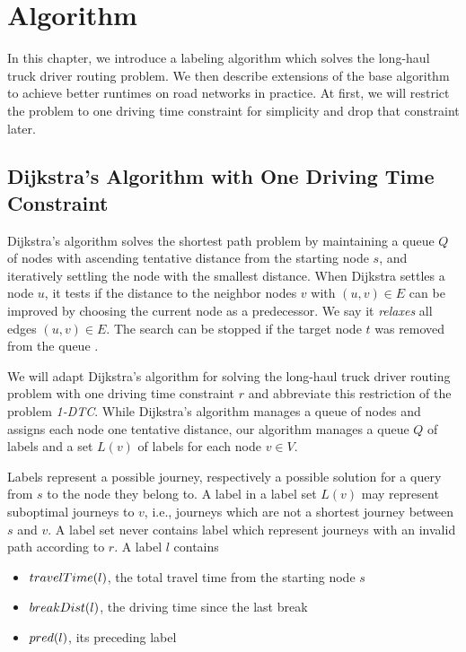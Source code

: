 
\chapter{Algorithm}
\label{ch:Algorithm}
In this chapter, we introduce a labeling algorithm which solves the long-haul truck driver routing problem. We then describe extensions of the base algorithm to achieve better runtimes on road networks in practice. At first, we will restrict the problem to one driving time constraint for simplicity and drop that constraint later.

\section{Dijkstra's Algorithm with One Driving Time Constraint\label{sec:dijkstra_csp}}
Dijkstra's algorithm solves the shortest path problem by maintaining a queue $Q$ of nodes with ascending tentative distance from the starting node $s$, and iteratively settling the node with the smallest distance. When Dijkstra settles a node $u$, it tests if the distance to the neighbor nodes $v$ with $(u,v) \in E$ can be improved by choosing the current node as a predecessor. We say it \emph{relaxes} all edges $(u,v) \in E$. The search can be stopped if the target node $t$ was removed from the queue \cite{dijkstra:1959}.

We will adapt Dijkstra's algorithm for solving the long-haul truck driver routing problem with one driving time constraint $r$ and abbreviate this restriction of the problem \emph{1-DTC}. While Dijkstra's algorithm manages a queue of nodes and assigns each node one tentative distance, our algorithm manages a queue $Q$ of labels and a set $L(v)$ of labels for each node $v \in V$.

Labels represent a possible journey, respectively a possible solution for a query from $s$ to the node they belong to. A label in a label set $L(v)$ may represent suboptimal journeys to $v$, i.e., journeys which are not a shortest journey between $s$ and $v$. A label set never contains label which represent journeys with an invalid path according to $r$. A label $l$ contains

\begin{itemize}
	\item $travelTime(l)$, the total travel time from the starting node $s$
	\item $breakDist(l)$, the driving time since the last break
	\item $pred(l)$, its preceding label
\end{itemize}

